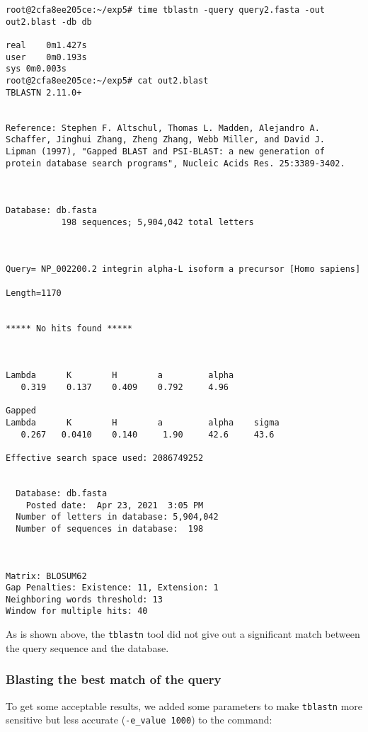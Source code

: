 \documentclass[en,black,10pt,normal]{elegantnote}
\newcommand{\upcite}[1]{\textsuperscript{\textsuperscript{\cite{#1}}}}
\begin{document}
\begin{lstlisting}
root@2cfa8ee205ce:~/exp5# time tblastn -query query2.fasta -out out2.blast -db db

real	0m1.427s
user	0m0.193s
sys	0m0.003s                               
root@2cfa8ee205ce:~/exp5# cat out2.blast 
TBLASTN 2.11.0+


Reference: Stephen F. Altschul, Thomas L. Madden, Alejandro A.
Schaffer, Jinghui Zhang, Zheng Zhang, Webb Miller, and David J.
Lipman (1997), "Gapped BLAST and PSI-BLAST: a new generation of
protein database search programs", Nucleic Acids Res. 25:3389-3402.



Database: db.fasta
           198 sequences; 5,904,042 total letters



Query= NP_002200.2 integrin alpha-L isoform a precursor [Homo sapiens]

Length=1170


***** No hits found *****



Lambda      K        H        a         alpha
   0.319    0.137    0.409    0.792     4.96 

Gapped
Lambda      K        H        a         alpha    sigma
   0.267   0.0410    0.140     1.90     42.6     43.6 

Effective search space used: 2086749252


  Database: db.fasta
    Posted date:  Apr 23, 2021  3:05 PM
  Number of letters in database: 5,904,042
  Number of sequences in database:  198



Matrix: BLOSUM62
Gap Penalties: Existence: 11, Extension: 1
Neighboring words threshold: 13
Window for multiple hits: 40

\end{lstlisting}
As is shown above, the \lstinline{tblastn}\upcite{altschul_gapped_1997} tool did not give out a
significant match between the query sequence and the database.


\subsubsection{Blasting the best match of the query}
To get some acceptable results, we added some parameters to make
\lstinline{tblastn} more sensitive but less accurate (\lstinline{-e_value 1000}) to the command:
\end{document}
